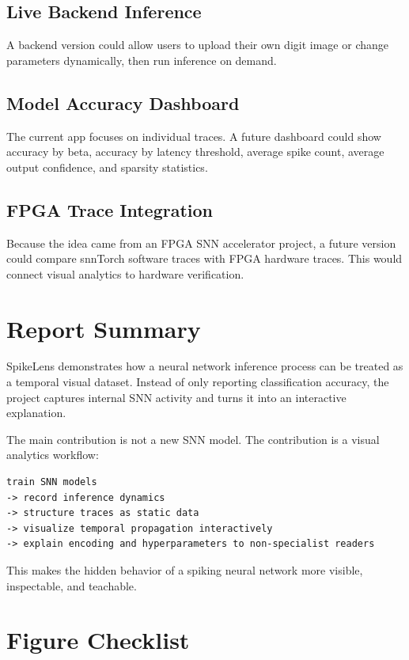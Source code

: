 \documentclass[11pt,a4paper]{article}
\newcommand{\projecttitle}{SpikeLens}
\begin{document}
\subsection{Live Backend Inference}

A backend version could allow users to upload their own digit image or change parameters dynamically, then run inference on demand.

\subsection{Model Accuracy Dashboard}

The current app focuses on individual traces. A future dashboard could show accuracy by beta, accuracy by latency threshold, average spike count, average output confidence, and sparsity statistics.

\subsection{FPGA Trace Integration}

Because the idea came from an FPGA SNN accelerator project, a future version could compare snnTorch software traces with FPGA hardware traces. This would connect visual analytics to hardware verification.

\section{Report Summary}

\projecttitle{} demonstrates how a neural network inference process can be treated as a temporal visual dataset. Instead of only reporting classification accuracy, the project captures internal SNN activity and turns it into an interactive explanation.

The main contribution is not a new SNN model. The contribution is a visual analytics workflow:

\begin{lstlisting}
train SNN models
-> record inference dynamics
-> structure traces as static data
-> visualize temporal propagation interactively
-> explain encoding and hyperparameters to non-specialist readers
\end{lstlisting}

This makes the hidden behavior of a spiking neural network more visible, inspectable, and teachable.

\section{Figure Checklist}
\end{document}
